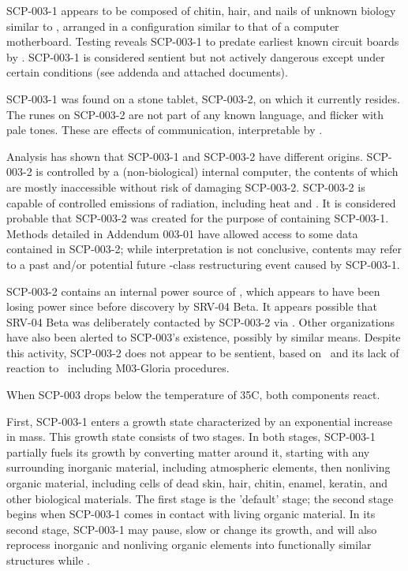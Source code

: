SCP-003-1 appears to be composed of chitin, hair, and nails of unknown biology similar to \redacted, arranged in a configuration similar to that of a computer motherboard. Testing reveals SCP-003-1 to predate earliest known circuit boards by \redacted. SCP-003-1 is considered sentient but not actively dangerous except under certain conditions (see addenda and attached documents).

SCP-003-1 was found on a stone tablet, SCP-003-2, on which it currently resides. The runes on SCP-003-2 are not part of any known language, and flicker with pale tones. These are effects of communication, interpretable by \expunged.

Analysis has shown that SCP-003-1 and SCP-003-2 have different origins. SCP-003-2 is controlled by a (non-biological) internal computer, the contents of which are mostly inaccessible without risk of damaging SCP-003-2. SCP-003-2 is capable of controlled emissions of radiation, including heat and \redacted. It is considered probable that SCP-003-2 was created for the purpose of containing SCP-003-1. Methods detailed in Addendum 003-01 have allowed access to some data contained in SCP-003-2; while interpretation is not conclusive, contents may refer to a past and/or potential future -class restructuring event caused by SCP-003-1.

SCP-003-2 contains an internal power source of \linebreak \expunged, which appears to have been losing power since  before discovery by SRV-04 Beta. It appears possible that SRV-04 Beta was deliberately contacted by SCP-003-2 via \expunged. Other organizations have also been alerted to SCP-003's existence, possibly by similar means. Despite this activity, SCP-003-2 does not appear to be sentient, based on \redacted \ and its lack of reaction to \redacted \ including M03-Gloria procedures.

When SCP-003 drops below the temperature of 35\degree C, both components react.

First, SCP-003-1 enters a growth state characterized by an exponential increase in mass. This growth state consists of two stages. In both stages, SCP-003-1 partially fuels its growth by converting matter around it, starting with any surrounding inorganic material, including atmospheric elements, then nonliving organic material, including cells of dead skin, hair, chitin, enamel, keratin, and other biological materials.
\newpage
The first stage is the 'default' stage; the second stage begins when SCP-003-1 comes in contact with living organic material. In its second stage, SCP-003-1 may pause, slow or change its growth, and will also reprocess inorganic and nonliving organic elements into functionally similar structures while \expunged.

